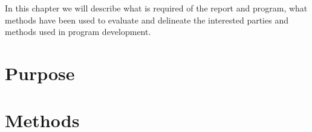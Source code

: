 In this chapter we will describe what is required of the report and program, what methods have been used to evaluate and delineate the interested parties and methods used in program development. 

\section{Purpose}


\section{Methods}
